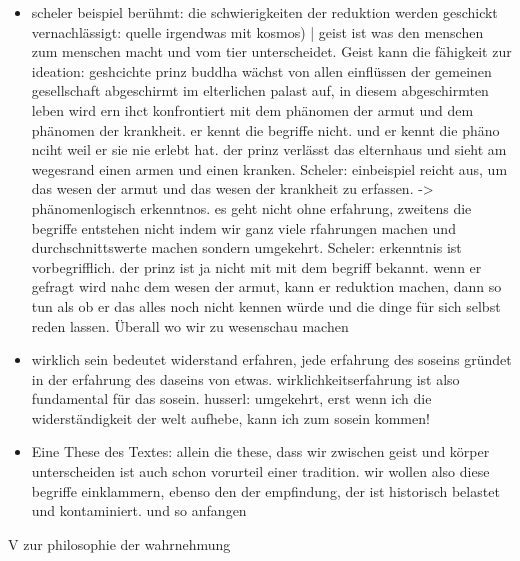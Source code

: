 \documentclass[emulatestandardclasses]{scrartcl}
\begin{document}
\begin{itemize}
  \item scheler beispiel berühmt: die schwierigkeiten der reduktion werden geschickt vernachlässigt: quelle irgendwas mit kosmos) | geist ist was den menschen zum menschen macht und vom tier unterscheidet. Geist kann die fähigkeit zur ideation: geshcichte prinz buddha wächst von allen einflüssen der gemeinen gesellschaft abgeschirmt im elterlichen palast auf, in diesem abgeschirmten leben wird ern ihct konfrontiert mit dem phänomen der armut und dem phänomen der krankheit. er kennt die begriffe nicht. und er kennt die phäno nciht weil er sie nie erlebt hat. der prinz verlässt das elternhaus und sieht am wegesrand einen armen und einen kranken. Scheler: einbeispiel reicht aus, um das wesen der armut und das wesen der krankheit zu erfassen. -> phänomenlogisch erkenntnos. es geht nicht ohne erfahrung, zweitens die begriffe entstehen nicht indem wir ganz viele rfahrungen machen und durchschnittswerte machen sondern umgekehrt. Scheler: erkenntnis ist vorbegrifflich. der prinz ist ja nicht mit mit dem begriff bekannt. wenn er gefragt wird nahc dem wesen der armut, kann er reduktion machen, dann so tun als ob er das alles noch nicht kennen würde und die dinge für sich selbst reden lassen. Überall wo wir zu wesenschau machen 
  \item wirklich sein bedeutet widerstand erfahren, jede erfahrung des soseins gründet in der erfahrung des daseins von etwas. wirklichkeitserfahrung ist also fundamental für das sosein. husserl: umgekehrt, erst wenn ich die widerständigkeit der welt aufhebe, kann ich zum sosein kommen!
  \item Eine These des Textes: allein die these, dass wir zwischen geist und körper unterscheiden ist auch schon vorurteil einer tradition. wir wollen also diese begriffe einklammern, ebenso den der empfindung, der ist historisch belastet und kontaminiert. und so anfangen
\end{itemize}

V zur philosophie der wahrnehmung
\end{document}
